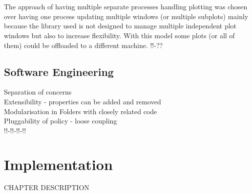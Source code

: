 \documentclass{l4proj}
\begin{document}
\\\\
\hspace*{3em} The approach of having multiple separate processes handling plotting was chosen over having one process updating multiple windows (or multiple subplots) mainly because the library used is not designed to manage multiple independent plot windows but also to increase flexibility. With this model some plots (or all of them) could be offloaded to a different machine. !!-??  
\section{Software Engineering}
Separation of concerns\\
Extensibility - properties can be added and removed\\
Modularisation in Folders with closely related code\\
Pluggability of policy - loose coupling\\
!!-!!-!!-!!
\newpage
\chapter{Implementation}
CHAPTER DESCRIPTION
\end{document}
